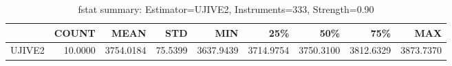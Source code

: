 \begin{table}[ht]
\centering
\caption{fstat summary: Estimator=UJIVE2, Instruments=333, Strength=0.90}
\begin{tabular}{lrrrrrrrr}
\toprule
 & COUNT & MEAN & STD & MIN & 25\% & 50\% & 75\% & MAX \\
\midrule
UJIVE2 & 10.0000 & 3754.0184 & 75.5399 & 3637.9439 & 3714.9754 & 3750.3100 & 3812.6329 & 3873.7370 \\
\bottomrule
\end{tabular}
\end{table}
